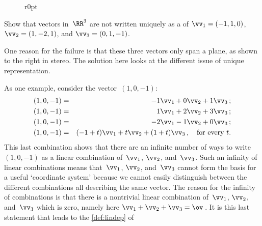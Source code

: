 \begin{figure}r{0pt}
\end{figure}
\begin{example}[3D failure] 
Show that vectors in~\(\RR^3\) are not written uniquely as a  of \(\vv_1=(-1,1,0)\), \(\vv_2=(1,-2,1)\), and \(\vv_3=(0,1,-1)\). 

One reason for the failure is that these three vectors only span a plane, as shown to the right in stereo.  
The solution here looks at the different issue of unique representation.

\begin{solution} 
As one example, consider the vector~\((1,0,-1)\):
\begin{eqnarray*}
(1,0,-1)&=&-1\vv_1+0\vv_2+1\vv_3\,;
\\(1,0,-1)&=&1\vv_1+2\vv_2+3\vv_3\,;
\\(1,0,-1)&=&-2\vv_1-1\vv_2+0\vv_3\,;
\\(1,0,-1)&=&(-1+t)\vv_1+t\vv_2+(1+t)\vv_3\,,\quad\text{for every }t.
\end{eqnarray*}
This last combination shows that there are an infinite number of ways to write \((1,0,-1)\) as a linear combination of~\(\vv_1\), \(\vv_2\), and~\(\vv_3\).
Such an infinity of linear combinations means that~\(\vv_1\), \(\vv_2\), and~\(\vv_3\) cannot form the basis for a useful `coordinate system' because we cannot easily distinguish between the different combinations all describing the same vector.
The reason for the infinity of combinations is that there is a nontrivial linear combination of~\(\vv_1\), \(\vv_2\), and~\(\vv_3\) which is zero, namely here \(\vv_1+\vv_2+\vv_3=\ov\)\,.
It is this last statement that leads to the \cref{def:lindep} of 
\end{solution}
\end{example}





